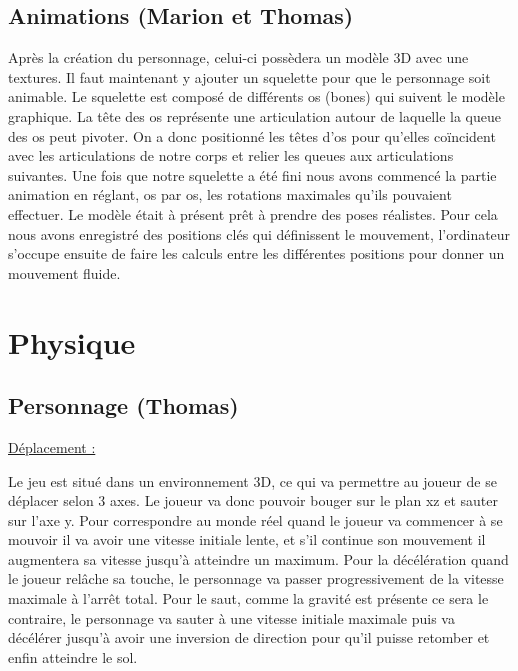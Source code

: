 \documentclass[a4paper , 12pt]{article}
\begin{document}
\newpage
	\subsection{Animations (Marion et Thomas)}

\quad

Après la création du personnage, celui-ci possèdera un modèle 3D avec une textures. Il faut maintenant y ajouter un squelette pour que le personnage soit animable. Le squelette est composé de différents os (bones) qui suivent le modèle graphique. La tête des os représente une articulation autour de laquelle la queue des os peut pivoter. On a donc positionné les têtes d’os pour qu’elles coïncident avec les articulations de notre corps et relier les queues aux articulations suivantes. Une fois que notre squelette a été fini nous avons commencé la partie animation en réglant, os par os, les rotations maximales qu’ils pouvaient effectuer. Le modèle était à présent prêt à prendre des poses réalistes. Pour cela nous avons enregistré des positions clés qui définissent le mouvement, l’ordinateur s’occupe ensuite de faire les calculs entre les différentes positions pour donner un mouvement fluide.
\quad


\section{Physique}


	\subsection{Personnage (Thomas)}


\quad

	\underline{Déplacement : }
	
	\quad

Le jeu est situé dans un environnement 3D, ce qui va permettre au joueur de se déplacer selon 3 axes. Le joueur va donc pouvoir bouger sur le plan xz et sauter sur l’axe y. Pour correspondre au monde réel quand le joueur va commencer à se mouvoir il va avoir une vitesse initiale lente, et s'il continue son mouvement il augmentera sa vitesse jusqu’à atteindre un maximum. Pour la décélération quand le joueur relâche sa touche, le personnage va passer progressivement de la vitesse maximale à l’arrêt total. Pour le saut, comme la gravité est présente ce sera le contraire, le personnage va sauter à une vitesse initiale maximale puis va décélérer jusqu’à avoir une inversion de direction pour qu’il puisse retomber et enfin atteindre le sol.
\end{document}

